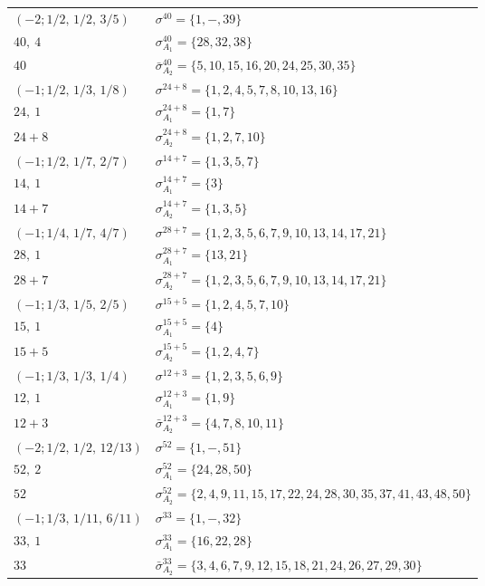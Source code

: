 \documentclass[10pt,a4paper]{amsart}
\theoremstyle{definition}
\numberwithin{equation}{section}
\begin{document}
\begin{table}[!t]\centering\renewcommand{\arraystretch}{1.22}
\begin{tabular}{|ll|}\hline
$(-2;1/2,\,1/2,\,3/5) $& $\sigma^{40} = \{1,-,39\}$ \\
$40,\ 4$& $\sigma_{A_{1}}^{40} = \{28,32,38\}$ \\
$40$ & $\bar\sigma_{A_{2}}^{40} = \{5,10,15,16,20,24,25,30,35\}$ \\
\hline
$(-1;1/2,\,1/3,\,1/8) $& $\sigma^{24 + 8} = \{1,2,4,5,7,8,10,13,16\}$ \\
$24,\ 1$& $\sigma_{A_{1}}^{24 + 8} = \{1,7\}$ \\
$24 + 8$ & $\sigma_{A_{2}}^{24 + 8} = \{1,2,7,10\}$ \\
\hline
$(-1;1/2,\,1/7,\,2/7) $& $\sigma^{14 + 7} = \{1,3,5,7\}$ \\
$14,\ 1$& $\sigma_{A_{1}}^{14 + 7} = \{3\}$ \\
$14 + 7$ & $\sigma_{A_{2}}^{14 + 7} = \{1,3,5\}$ \\
\hline
$(-1;1/4,\,1/7,\,4/7) $& $\sigma^{28 + 7} = \{1,2,3,5,6,7,9,10,13,14,17,21\}$ \\
$28,\ 1$& $\sigma_{A_{1}}^{28 + 7} = \{13,21\}$ \\
$28 + 7$ & $\sigma_{A_{2}}^{28 + 7} = \{1,2,3,5,6,7,9,10,13,14,17,21\}$ \\
\hline
$(-1;1/3,\,1/5,\,2/5) $& $\sigma^{15 + 5} = \{1,2,4,5,7,10\}$ \\
$15,\ 1$& $\sigma_{A_{1}}^{15 + 5} = \{4\}$ \\
$15 + 5$ & $\sigma_{A_{2}}^{15 + 5} = \{1,2,4,7\}$ \\
\hline
$(-1;1/3,\,1/3,\,1/4) $& $\sigma^{12 + 3} = \{1,2,3,5,6,9\}$ \\
$12,\ 1$& $\sigma_{A_{1}}^{12 + 3} = \{1,9\}$ \\
$12 + 3$ & $\bar\sigma_{A_{2}}^{12 + 3} = \{4,7,8,10,11\}$ \\
\hline
$(-2;1/2,\,1/2,\,12/13) $& $\sigma^{52} = \{1,-,51\}$ \\
$52,\ 2$& $\sigma_{A_{1}}^{52} = \{24,28,50\}$ \\
$52$ & $\sigma_{A_{2}}^{52} = \{2,4,9,11,15,17,22,24,28,30,35,37,41,43,48,50\}$ \\
\hline
$(-1;1/3,\,1/11,\,6/11) $& $\sigma^{33} = \{1,-,32\}$ \\
$33,\ 1$& $\sigma_{A_{1}}^{33} = \{16,22,28\}$ \\
$33$ & $\bar\sigma_{A_{2}}^{33} = \{3,4,6,7,9,12,15,18,21,24,26,27,29,30\}$ \\

\end{tabular}
\end{table}
\end{document}
